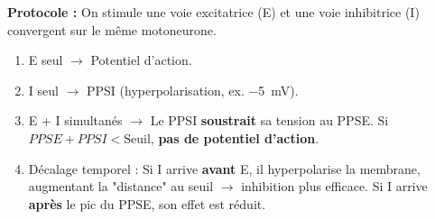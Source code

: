 \documentclass[11pt]{article}
\begin{document}
\begin{experience}
\textbf{Protocole :} On stimule une voie excitatrice (E) et une voie inhibitrice (I) convergent sur le même motoneurone.
\begin{enumerate}
    \item E seul $\rightarrow$ Potentiel d'action.
    \item I seul $\rightarrow$ PPSI (hyperpolarisation, ex. \SI{-5}{mV}).
    \item E + I simultanés $\rightarrow$ Le PPSI \textbf{soustrait} sa tension au PPSE. Si $PPSE + PPSI < \text{Seuil}$, \textbf{pas de potentiel d'action}.
    \item Décalage temporel : Si I arrive \textbf{avant} E, il hyperpolarise la membrane, augmentant la "distance" au seuil $\rightarrow$ inhibition plus efficace. Si I arrive \textbf{après} le pic du PPSE, son effet est réduit.
\end{enumerate}


\end{experience}
\end{document}
